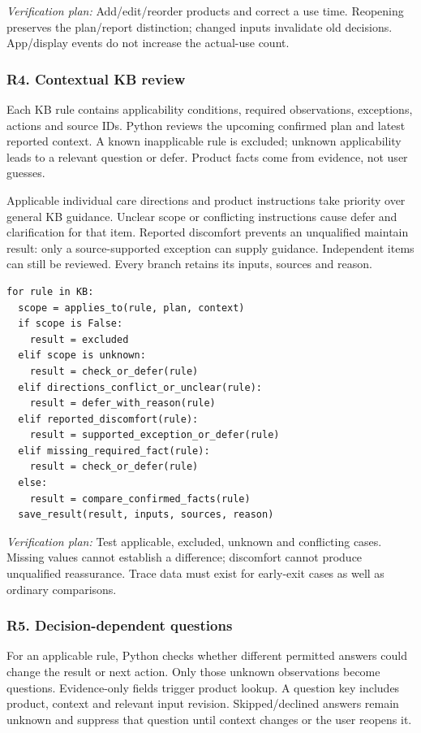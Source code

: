 \documentclass[conference,letterpaper]{IEEEtran}
\begin{document}
\textit{Verification plan:} Add/edit/reorder products and correct a use time. Reopening preserves the plan/report distinction; changed inputs invalidate old decisions. App/display events do not increase the actual-use count.

\subsubsection*{R4. Contextual KB review}

Each KB rule contains applicability conditions, required observations, exceptions, actions and source IDs. Python reviews the upcoming confirmed plan and latest reported context. A known inapplicable rule is excluded; unknown applicability leads to a relevant question or defer. Product facts come from evidence, not user guesses.

Applicable individual care directions and product instructions take priority over general KB guidance. Unclear scope or conflicting instructions cause defer and clarification for that item. Reported discomfort prevents an unqualified maintain result: only a source-supported exception can supply guidance. Independent items can still be reviewed. Every branch retains its inputs, sources and reason.

\begin{lstlisting}
for rule in KB:
  scope = applies_to(rule, plan, context)
  if scope is False:
    result = excluded
  elif scope is unknown:
    result = check_or_defer(rule)
  elif directions_conflict_or_unclear(rule):
    result = defer_with_reason(rule)
  elif reported_discomfort(rule):
    result = supported_exception_or_defer(rule)
  elif missing_required_fact(rule):
    result = check_or_defer(rule)
  else:
    result = compare_confirmed_facts(rule)
  save_result(result, inputs, sources, reason)
\end{lstlisting}



\textit{Verification plan:} Test applicable, excluded, unknown and conflicting cases. Missing values cannot establish a difference; discomfort cannot produce unqualified reassurance. Trace data must exist for early-exit cases as well as ordinary comparisons.

\subsubsection*{R5. Decision-dependent questions}

For an applicable rule, Python checks whether different permitted answers could change the result or next action. Only those unknown observations become questions. Evidence-only fields trigger product lookup. A question key includes product, context and relevant input revision. Skipped/declined answers remain unknown and suppress that question until context changes or the user reopens it.
\end{document}
